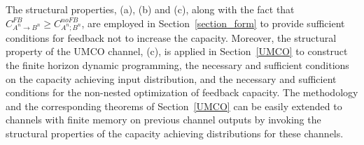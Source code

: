\documentclass[11pt, a4paper, journal,onecolumn]{IEEEtran}
\newcommand{\rar}{\rightarrow}
\begin{document}
\par The structural properties, (a), (b) and (c),  along with the fact that $C_{A^n \rar B^n}^{FB}\geq C_{A^n ; B^n}^{noFB}$, are employed in Section~\ref{section_form}  to provide sufficient conditions for feedback not to increase the capacity.  Moreover, the structural property of the UMCO channel, (c), is applied in Section~\ref{UMCO} to construct the finite horizon dynamic programming, the necessary and sufficient conditions on the capacity achieving input distribution, and the necessary and sufficient conditions for the non-nested optimization of feedback capacity. The  methodology and the corresponding theorems of Section~\ref{UMCO}  can be easily extended to channels with finite memory on  previous channel outputs by invoking the structural properties of the capacity achieving  distributions for these channels.
\end{document}
